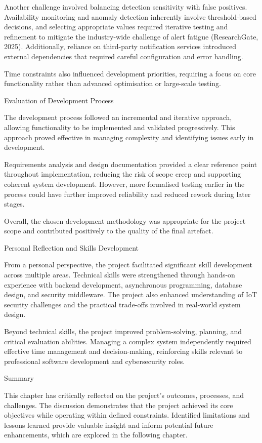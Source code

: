 Another challenge involved balancing detection sensitivity with false positives. Availability monitoring and anomaly detection inherently involve threshold-based decisions, and selecting appropriate values required iterative testing and refinement to mitigate the industry-wide challenge of alert fatigue (ResearchGate, 2025). Additionally, reliance on third-party notification services introduced external dependencies that required careful configuration and error handling.

Time constraints also influenced development priorities, requiring a focus on core functionality rather than advanced optimisation or large-scale testing.

Evaluation of Development Process

The development process followed an incremental and iterative approach, allowing functionality to be implemented and validated progressively. This approach proved effective in managing complexity and identifying issues early in development.

Requirements analysis and design documentation provided a clear reference point throughout implementation, reducing the risk of scope creep and supporting coherent system development. However, more formalised testing earlier in the process could have further improved reliability and reduced rework during later stages.

Overall, the chosen development methodology was appropriate for the project scope and contributed positively to the quality of the final artefact.

Personal Reflection and Skills Development

From a personal perspective, the project facilitated significant skill development across multiple areas. Technical skills were strengthened through hands-on experience with backend development, asynchronous programming, database design, and security middleware. The project also enhanced understanding of IoT security challenges and the practical trade-offs involved in real-world system design.

Beyond technical skills, the project improved problem-solving, planning, and critical evaluation abilities. Managing a complex system independently required effective time management and decision-making, reinforcing skills relevant to professional software development and cybersecurity roles.

Summary

This chapter has critically reflected on the project's outcomes, processes, and challenges. The discussion demonstrates that the project achieved its core objectives while operating within defined constraints. Identified limitations and lessons learned provide valuable insight and inform potential future enhancements, which are explored in the following chapter.

